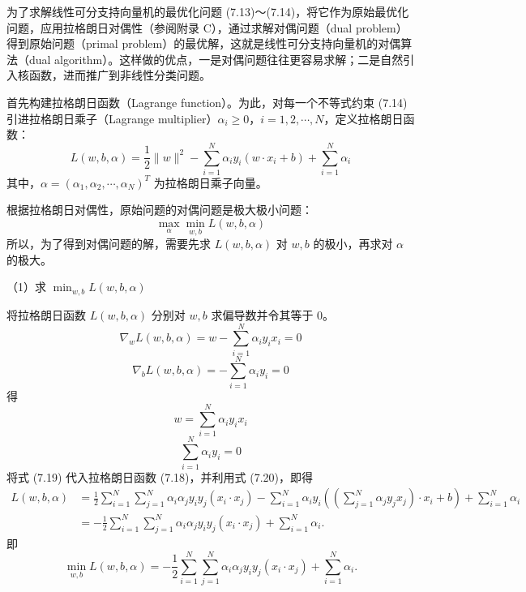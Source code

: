 \documentclass[UTF8,12pt,a4paper,fontset=fandol]{ctexart}
\begin{document}
为了求解线性可分支持向量机的最优化问题 (7.13)～(7.14)，将它作为原始最优化问题，应用拉格朗日对偶性（参阅附录 C），通过求解对偶问题（dual problem）得到原始问题（primal problem）的最优解，这就是线性可分支持向量机的对偶算法（dual algorithm）。这样做的优点，一是对偶问题往往更容易求解；二是自然引入核函数，进而推广到非线性分类问题。

首先构建拉格朗日函数（Lagrange function）。为此，对每一个不等式约束 (7.14) 引进拉格朗日乘子（Lagrange multiplier）$\alpha_i\geq 0$，$i=1,2,\cdots,N$，定义拉格朗日函数：
\begin{equation}
L(w,b,\alpha)=\frac{1}{2}\|w\|^2-\sum_{i=1}^N\alpha_i y_i(w\cdot x_i+b)+\sum_{i=1}^N\alpha_i
\tag{7.18}
\end{equation}
其中，$\alpha=(\alpha_1,\alpha_2,\cdots,\alpha_N)^T$ 为拉格朗日乘子向量。

根据拉格朗日对偶性，原始问题的对偶问题是极大极小问题：
\[
\max_\alpha\min_{w,b}L(w,b,\alpha)
\]
所以，为了得到对偶问题的解，需要先求 $L(w,b,\alpha)$ 对 $w,b$ 的极小，再求对 $\alpha$ 的极大。

（1）求 $\min_{w,b}L(w,b,\alpha)$

将拉格朗日函数 $L(w,b,\alpha)$ 分别对 $w,b$ 求偏导数并令其等于 0。
\[
\nabla_w L(w,b,\alpha)=w-\sum_{i=1}^N\alpha_i y_i x_i=0
\]
\[
\nabla_b L(w,b,\alpha)=-\sum_{i=1}^N\alpha_i y_i=0
\]
得
\begin{equation}
w=\sum_{i=1}^N\alpha_i y_i x_i
\tag{7.19}
\end{equation}
\begin{equation}
\sum_{i=1}^N\alpha_i y_i=0
\tag{7.20}
\end{equation}
将式 (7.19) 代入拉格朗日函数 (7.18)，并利用式 (7.20)，即得
\[
\begin{aligned}
L(w,b,\alpha)
&=\frac{1}{2}\sum_{i=1}^N\sum_{j=1}^N\alpha_i\alpha_j y_i y_j(x_i\cdot x_j)
-\sum_{i=1}^N\alpha_i y_i\left(\left(\sum_{j=1}^N\alpha_j y_j x_j\right)\cdot x_i+b\right)+\sum_{i=1}^N\alpha_i\\
&=-\frac{1}{2}\sum_{i=1}^N\sum_{j=1}^N\alpha_i\alpha_j y_i y_j(x_i\cdot x_j)+\sum_{i=1}^N\alpha_i .
\end{aligned}
\]
即
\[
\min_{w,b}L(w,b,\alpha)
=-\frac{1}{2}\sum_{i=1}^N\sum_{j=1}^N\alpha_i\alpha_j y_i y_j(x_i\cdot x_j)+\sum_{i=1}^N\alpha_i.
\]
\end{document}
